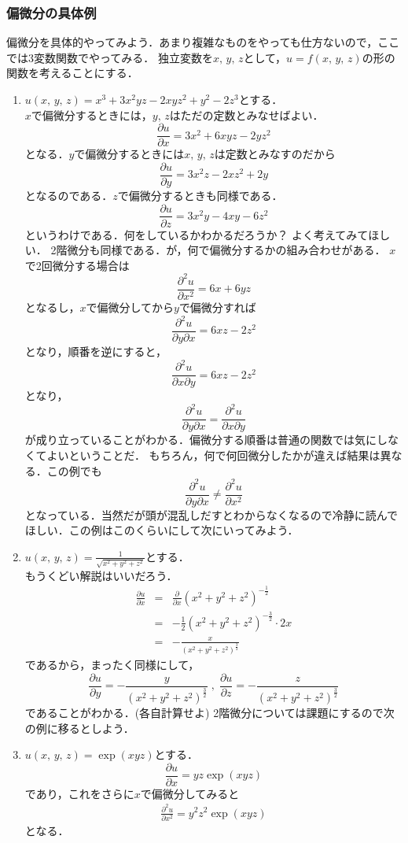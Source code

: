 \subsubsection{偏微分の具体例}
偏微分を具体的やってみよう．あまり複雑なものをやっても仕方ないので，ここでは3変数関数でやってみる．
独立変数を$x, \, y, \, z$として，$u=f(x, \, y, \, z)$の形の関数を考えることにする．
\label{ex:henbibun}
\begin{enumerate}
\item $u(x, \, y, \, z)=x^3+3x^2yz-2xyz^2+y^2-2z^3$とする． \\
$x$で偏微分するときには，$y, \, z$はただの定数とみなせばよい．
$$
\frac{\partial u}{\partial x} = 3x^2+6xyz-2yz^2 
$$
となる．$y$で偏微分するときには$x, \, y, \, z$は定数とみなすのだから
$$
\frac{\partial u}{\partial y} = 3x^2z-2xz^2+2y
$$
となるのである．$z$で偏微分するときも同様である．
$$
\frac{\partial u}{\partial z} = 3x^2y-4xy-6z^2
$$
というわけである．何をしているかわかるだろうか？ よく考えてみてほしい．
2階微分も同様である．が，何で偏微分するかの組み合わせがある．
$x$で2回微分する場合は
$$
\frac{\partial^2 u}{\partial x^2} = 6x+6yz
$$
となるし，$x$で偏微分してから$y$で偏微分すれば
$$
\frac{\partial ^2 u}{\partial y \partial x} = 6xz-2z^2
$$
となり，順番を逆にすると，
$$
\frac{\partial ^2 u}{\partial x \partial y} = 6xz-2z^2
$$
となり，
$$
\frac{\partial ^2 u}{\partial y \partial x} = \frac{\partial ^2 u}{\partial x \partial y}
$$
が成り立っていることがわかる．偏微分する順番は普通の関数では気にしなくてよいということだ．
もちろん，何で何回微分したかが違えば結果は異なる．この例でも
$$
\frac{\partial ^2 u}{\partial y \partial x} \neq \frac{\partial^2 u}{\partial x^2}
$$
となっている．当然だが頭が混乱しだすとわからなくなるので冷静に読んでほしい．この例はこのくらいにして次にいってみよう．
\item $\displaystyle u(x, \, y, \, z) = \frac{1}{\sqrt{x^2+y^2+z^2}}$とする．\\
もうくどい解説はいいだろう．
\begin{eqnarray*}
\frac{\partial u}{\partial x} & = & \frac{\partial}{\partial x} (x^2+y^2+z^2)^{-\frac{1}{2}} \\
& = & -\frac{1}{2} (x^2+y^2+z^2)^{-\frac{3}{2}} \cdot 2x \\
& = & -\frac{x}{(x^2+y^2+z^2)^{\frac{3}{2}}}
\end{eqnarray*}
であるから，まったく同様にして，
$$
\frac{\partial u}{\partial y} = -\frac{y}{(x^2+y^2+z^2)^{\frac{3}{2}}} \; , \; 
\frac{\partial u}{\partial z} = -\frac{z}{(x^2+y^2+z^2)^{\frac{3}{2}}}
$$
であることがわかる．(各自計算せよ)
2階微分については課題にするので次の例に移るとしよう．
\item $u(x, \, y, \, z) = \exp (xyz)$とする．
$$
\frac{\partial u}{\partial x} = yz \exp (xyz)
$$
であり，これをさらに$x$で偏微分してみると
\begin{align*}
\frac{\partial^2 u}{\partial x^2} = y^2z^2 \exp (xyz)
\end{align*}
となる．
\label{ex:henbibun2}
\end{enumerate}

